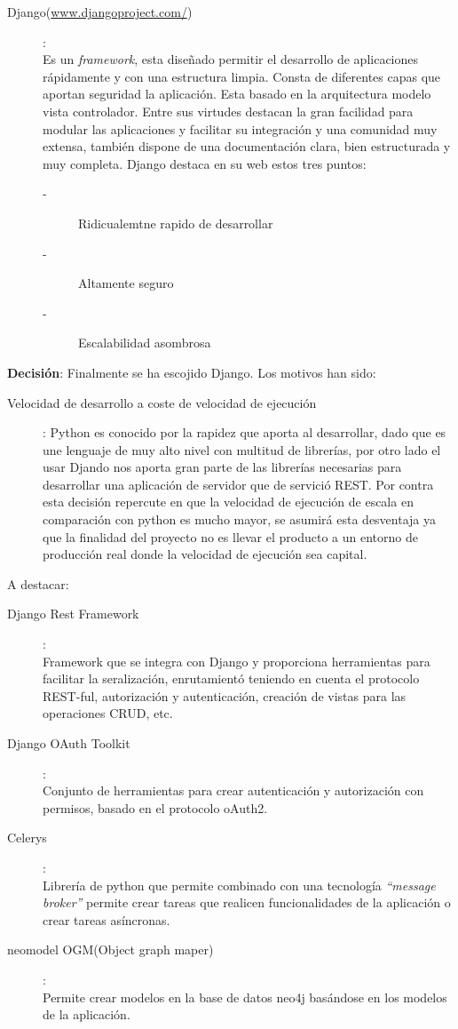 \begin{description}
\begin{description}
\item[Django(\url{www.djangoproject.com/})]:
\\Es un \textit{framework}, esta diseñado permitir el desarrollo de aplicaciones rápidamente y con una estructura limpia. Consta de diferentes capas que aportan seguridad la aplicación. Esta basado en la arquitectura modelo vista controlador. Entre sus virtudes destacan la gran facilidad para modular las aplicaciones y facilitar su integración y una comunidad muy extensa, también dispone de una documentación clara, bien estructurada y muy completa. Django destaca en su web estos tres puntos:
\begin{description}
\item[-]Ridicualemtne rapido de desarrollar
\item[-]Altamente seguro
\item[-]Escalabilidad asombrosa
\end{description}
\end{description}

\textbf{Decisión}:
Finalmente se ha escojido Django. Los motivos han sido:
\begin{description}
\item[Velocidad de desarrollo a coste de velocidad de ejecución]: Python es conocido por la rapidez que aporta al desarrollar, dado que es une lenguaje de muy alto nivel con multitud de librerías, por otro lado el usar Djando nos aporta gran parte de las librerías necesarias para desarrollar una aplicación de servidor que de servició REST. Por contra esta decisión repercute en que la velocidad de ejecución de escala en comparación con python es mucho mayor, se asumirá esta desventaja ya que la finalidad del proyecto no es llevar el producto a un entorno de producción real donde la velocidad de ejecución sea capital. 
\end{description}
A destacar:
\begin{description}
\item[Django Rest Framework]:\\Framework que se integra con Django y proporciona herramientas para facilitar la seralización, enrutamientó teniendo en cuenta el protocolo REST-ful, autorización y autenticación, creación de vistas para las operaciones CRUD, etc.
\item[Django OAuth Toolkit]:\\Conjunto de herramientas para crear autenticación y autorización con permisos, basado en el protocolo oAuth2.
\item[Celerys]:\\Librería de python que permite combinado con una tecnología \textit{``message broker''} permite crear tareas que realicen funcionalidades de la aplicación o crear tareas asíncronas.
\item[neomodel OGM(Object graph maper)]:\\Permite crear modelos en la base de datos neo4j basándose en los modelos de la aplicación.
\end{description}
\end{description}


